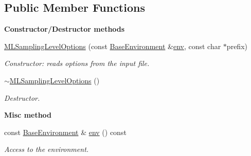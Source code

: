 \subsection*{Public Member Functions}
\begin{Indent}{\bf Constructor/\-Destructor methods}\par
\begin{DoxyCompactItemize}
\item 
\hyperlink{class_q_u_e_s_o_1_1_m_l_sampling_level_options_aa7b40be8dee82bd18cac2a9992fbd689}{M\-L\-Sampling\-Level\-Options} (const \hyperlink{class_q_u_e_s_o_1_1_base_environment}{Base\-Environment} \&\hyperlink{class_q_u_e_s_o_1_1_m_l_sampling_level_options_afd8e8e8ba3c116b9a17b1d2497daaa1d}{env}, const char $\ast$prefix)
\begin{DoxyCompactList}\small\item\em Constructor\-: reads options from the input file. \end{DoxyCompactList}\item 
\hyperlink{class_q_u_e_s_o_1_1_m_l_sampling_level_options_a6dbb3e59abf33c2b485d2cbd429e9b32}{$\sim$\-M\-L\-Sampling\-Level\-Options} ()
\begin{DoxyCompactList}\small\item\em Destructor. \end{DoxyCompactList}\end{DoxyCompactItemize}
\end{Indent}
\begin{Indent}{\bf Misc method}\par
\begin{DoxyCompactItemize}
\item 
const \hyperlink{class_q_u_e_s_o_1_1_base_environment}{Base\-Environment} \& \hyperlink{class_q_u_e_s_o_1_1_m_l_sampling_level_options_afd8e8e8ba3c116b9a17b1d2497daaa1d}{env} () const 
\begin{DoxyCompactList}\small\item\em Access to the environment. \end{DoxyCompactList}\end{DoxyCompactItemize}
\end{Indent}
